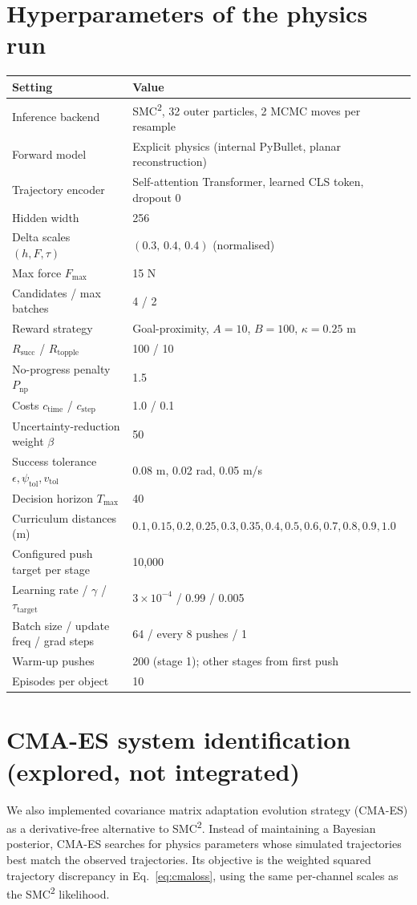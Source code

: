 \documentclass[12pt]{article}
\begin{document}
\section{Hyperparameters of the physics run}\label{app:hp}
\small
\noindent\begin{tabular}{@{}ll@{}}\toprule
Setting & Value \\\midrule
Inference backend & SMC\textsuperscript{2}, 32 outer particles, 2 MCMC moves per resample \\
Forward model & Explicit physics (internal PyBullet, planar reconstruction) \\
Trajectory encoder & Self-attention Transformer, learned CLS token, dropout 0 \\
Hidden width & 256 \\
Delta scales $(h,F,\tau)$ & $(0.3,\,0.4,\,0.4)$ (normalised) \\
Max force $F_{\max}$ & 15 N \\
Candidates / max batches & 4 / 2 \\
Reward strategy & Goal-proximity, $A=10$, $B=100$, $\kappa=0.25$ m \\
$R_{\mathrm{succ}}$ / $R_{\mathrm{topple}}$ & 100 / 10 \\
No-progress penalty $P_{\mathrm{np}}$ & 1.5 \\
Costs $c_{\mathrm{time}}$ / $c_{\mathrm{step}}$ & 1.0 / 0.1 \\
Uncertainty-reduction weight $\beta$ & 50 \\
Success tolerance $\epsilon,\psi_{\mathrm{tol}},v_{\mathrm{tol}}$ & 0.08 m, 0.02 rad, 0.05 m/s \\
Decision horizon $T_{\max}$ & 40 \\
Curriculum distances (m) & $0.1,0.15,0.2,0.25,0.3,0.35,0.4,0.5,0.6,0.7,0.8,0.9,1.0$ \\
Configured push target per stage & 10,000 \\
Learning rate / $\gamma$ / $\tau_{\mathrm{target}}$ & $3\times 10^{-4}$ / 0.99 / 0.005 \\
Batch size / update freq / grad steps & 64 / every 8 pushes / 1 \\
Warm-up pushes & 200 (stage 1); other stages from first push \\
Episodes per object & 10 \\\bottomrule
\end{tabular}
\normalsize



\section{CMA-ES system identification (explored, not integrated)}\label{app:cmaes}
We also implemented covariance matrix adaptation evolution strategy (CMA-ES) \cite{cmaes} as a derivative-free alternative to SMC\textsuperscript{2}. Instead of maintaining a Bayesian posterior, CMA-ES searches for physics parameters whose simulated trajectories best match the observed trajectories. Its objective is the weighted squared trajectory discrepancy in Eq.~\eqref{eq:cmaloss}, using the same per-channel scales as the SMC\textsuperscript{2} likelihood.
\end{document}
